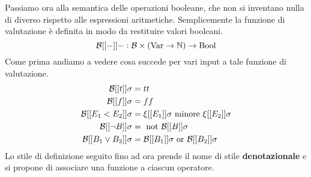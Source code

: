 Passiamo ora alla semantica delle operazioni booleane, che
non si inventano nulla di diverso rispetto alle espressioni
aritmetiche. Semplicemente la funzione di valutazione è
definita in modo da restituire valori booleani.
\[ \mathcal{B}[[-]] - : \mathcal{B} \times (\operatorname{Var} \to \mathbb{N}) \to \text{Bool} \]
Come prima andiamo a vedere cosa succede per vari input a
tale funzione di valutazione.
\begin{align*}
	\mathcal{B} [[t]] \sigma            & = tt                           \\
	\mathcal{B} [[f]] \sigma            & = ff                           \\
	\mathcal{B} [[E_1 < E_2]] \sigma    & =
	\xi [[E_1]] \sigma \text{ minore } \xi [[E_2]] \sigma       \\
	\mathcal{B} [[\lnot B]] \sigma      & = \text{ not } \mathcal{B} [[B]] \sigma \\
	\mathcal{B} [[B_1 \lor B_2]] \sigma & = \mathcal{B} [[B_1]] \sigma
	\text{ or } \mathcal{B} [[B_2]] \sigma
\end{align*}
Lo stile di definizione seguito fino ad ora prende il nome di
stile \textbf{denotazionale} e si propone di associare una
funzione a ciascun operatore.
